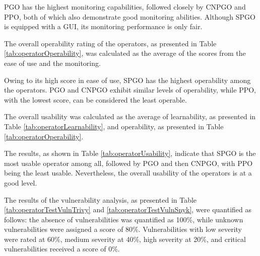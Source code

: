 PGO has the highest monitoring capabilities, followed closely by CNPGO and PPO, both of which also demonstrate good monitoring abilities. Although SPGO is equipped with a GUI, its monitoring performance is only fair.



The overall operability rating of the operators, as presented in Table \ref{tab:operatorOperability}, was calculated as the average of the scores from the ease of use and the monitoring.

Owing to its high score in ease of use, SPGO has the highest operability among the operators. PGO and CNPGO exhibit similar levels of operability, while PPO, with the lowest score, can be considered the least operable.


The overall usability was calculated as the average of learnability, as presented in Table \ref{tab:operatorLearnability}, and operability, as presented in Table \ref{tab:operatorOperability}.

The results, as shown in Table \ref{tab:operatorUsability}, indicate that SPGO is the most usable operator among all, followed by PGO and then CNPGO, with PPO being the least usable.
Nevertheless, the overall usability of the operators is at a good level.



The results of the vulnerability analysis, as presented in Table \ref{tab:operatorTestVulnTrivy} and \ref{tab:operatorTestVulnSnyk}, were quantified as follows:
the absence of vulnerabilities was quantified as 100\%, while unknown vulnerabilities were assigned a score of 80\%. Vulnerabilities with low severity were rated at 60\%, medium severity at 40\%, high severity at 20\%, and critical vulnerabilities received a score of 0\%.

